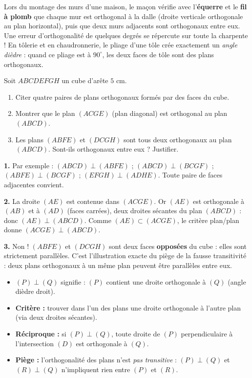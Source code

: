 \documentclass[11pt]{article}
\begin{document}
\begin{savaistu}
Lors du montage des murs d'une maison, le maçon vérifie avec l'\textbf{équerre} et le \textbf{fil à plomb} que chaque mur est orthogonal à la dalle (droite verticale orthogonale au plan horizontal), puis que deux murs adjacents sont orthogonaux entre eux. Une erreur d'orthogonalité de quelques degrés se répercute sur toute la charpente ! En tôlerie et en chaudronnerie, le pliage d'une tôle crée exactement un \emph{angle dièdre} : quand ce pliage est à $90^\circ$, les deux faces de tôle sont des plans orthogonaux.
\end{savaistu}

\begin{exercice}[À faire]
Soit $ABCDEFGH$ un cube d'arête $5$ cm.
\begin{enumerate}
  \item Citer quatre paires de plans orthogonaux formés par des faces du cube.
  \item Montrer que le plan $(ACGE)$ (plan diagonal) est orthogonal au plan $(ABCD)$.
  \item Les plans $(ABFE)$ et $(DCGH)$ sont tous deux orthogonaux au plan $(ABCD)$. Sont-ils orthogonaux entre eux ? Justifier.
\end{enumerate}
\end{exercice}

\begin{corrige}[Exercice]
\textbf{1.} Par exemple : $(ABCD) \perp (ABFE)$ ; $(ABCD) \perp (BCGF)$ ; $(ABFE) \perp (BCGF)$ ; $(EFGH) \perp (ADHE)$. Toute paire de faces adjacentes convient.

\textbf{2.} La droite $(AE)$ est contenue dans $(ACGE)$. Or $(AE)$ est orthogonale à $(AB)$ et à $(AD)$ (faces carrées), deux droites sécantes du plan $(ABCD)$ : donc $(AE) \perp (ABCD)$. Comme $(AE) \subset (ACGE)$, le critère plan/plan donne $(ACGE) \perp (ABCD)$.

\textbf{3.} Non ! $(ABFE)$ et $(DCGH)$ sont deux faces \textbf{opposées} du cube : elles sont strictement parallèles. C'est l'illustration exacte du piège de la fausse transitivité : deux plans orthogonaux à un même plan peuvent être parallèles entre eux.
\end{corrige}

\begin{aretenir}
\begin{itemize}
  \item $(P) \perp (Q)$ signifie : $(P)$ contient une droite orthogonale à $(Q)$ (angle dièdre droit).
  \item \textbf{Critère :} trouver dans l'un des plans une droite orthogonale à l'autre plan (via deux droites sécantes).
  \item \textbf{Réciproque :} si $(P) \perp (Q)$, toute droite de $(P)$ perpendiculaire à l'intersection $(D)$ est orthogonale à $(Q)$.
  \item \textbf{Piège :} l'orthogonalité des plans n'est \emph{pas transitive} : $(P) \perp (Q)$ et $(R) \perp (Q)$ n'impliquent rien entre $(P)$ et $(R)$.
\end{itemize}
\end{aretenir}
\end{document}
